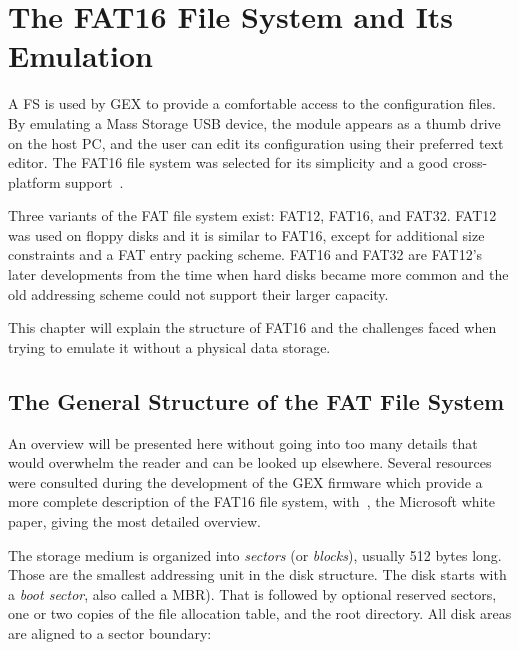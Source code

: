 \chapter{The FAT16 File System and Its Emulation} \label{sec:fat16}

A \gls{FS} is used by GEX to provide a comfortable access to the configuration files. By emulating a Mass Storage \gls{USB} device, the module appears as a thumb drive on the host \gls{PC}, and the user can edit its configuration using their preferred text editor. The FAT16 file system was selected for its simplicity and a good cross-platform support~\cite{os-support-table}.

Three variants of the \gls{FAT} file system exist: FAT12, FAT16, and FAT32. FAT12 was used on floppy disks and it is similar to FAT16, except for additional size constraints and a \gls{FAT} entry packing scheme. FAT16 and FAT32 are FAT12's later developments from the time when hard disks became more common and the old addressing scheme could not support their larger capacity.

This chapter will explain the structure of FAT16 and the challenges faced when trying to emulate it without a physical data storage.

\section{The General Structure of the FAT File System}

An overview will be presented here without going into too many details that would overwhelm the reader and can be looked up elsewhere. Several resources~\cite{ms-fat,fat16-brainy,fat16-maverick,fat16-phobos,fat-whitepaper} were consulted during the development of the GEX firmware which provide a more complete description of the FAT16 file system, with~\cite{fat-whitepaper}, the Microsoft white paper, giving the most detailed overview.

The storage medium is organized into \textit{sectors} (or \textit{blocks}), usually 512 bytes long. Those are the smallest addressing unit in the disk structure. The disk starts with a \textit{boot sector}, also called a \gls{MBR}). That is followed by optional reserved sectors, one or two copies of the file allocation table, and the root directory. All disk areas are aligned to a sector boundary:

